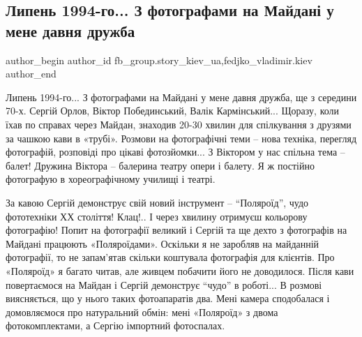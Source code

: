  
 
 
 
 
 
\subsection{Липень 1994-го... З фотографами на Майдані у мене давня дружба}
\label{sec:05_12_2021.fb.fb_group.story_kiev_ua.2.1994_maidan_foto}
 
\ifcmt
 author_begin
   author_id fb_group.story_kiev_ua,fedjko_vladimir.kiev
 author_end
\fi

\begin{multicols}{2} %

Липень 1994-го... З фотографами на Майдані у мене давня дружба, ще з середини
70-х. Сергій Орлов, Віктор Побединський, Валік Кармінський... Щоразу, коли їхав
по справах через Майдан, знаходив 20-30 хвилин для спілкування з друзями за
чашкою кави в «трубі». Розмови на фотографічні теми – нова техніка, перегляд
фотографій, розповіді про цікаві фотозйомки... З Віктором у нас спільна тема –
балет! Дружина Віктора – балерина театру опери і балету. Я ж постійно
фотографую в хореографічному училищі і театрі. 

\setlength{\parindent}{0pt}


\end{multicols} %

За кавою Сергій демонструє свій новий інструмент – \enquote{Поляроїд}, чудо фототехніки
ХХ століття! Клац!.. І через хвилину отримуєш кольорову фотографію! Попит на
фотографії великий і Сергій та ще дехто з фотографів на Майдані працюють
«Поляроїдами». Оскільки я не заробляв на майданній фотографії, то не запам’ятав
скільки коштувала фотографія для клієнтів. Про «Поляроїд» я багато читав, але
живцем побачити його не доводилося.  Після кави повертаємося на Майдан і Сергій
демонструє \enquote{чудо} в роботі... В розмові виясняється, що у нього таких
фотоапаратів два. Мені камера сподобалася і домовляємося про натуральний обмін:
мені «Поляроїд» з двома фотокомплектами, а Сергію імпортний фотоспалах.

